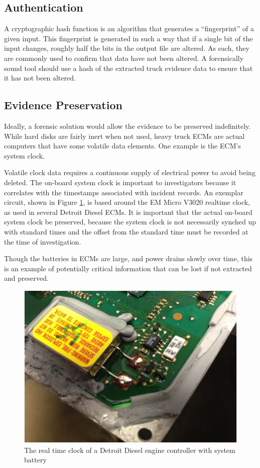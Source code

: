 \subsection{Authentication}

A cryptographic hash function is an algorithm that generates a “fingerprint” of a given input. This fingerprint is generated in such a way that if a single bit of the input changes, 
roughly half the bits in the output file are altered\cite{schneier1996}. As such, they are commonly used to confirm that data have not been altered. A forensically sound tool should use a hash of 
the extracted truck evidence data to ensure that it has not been altered.

\subsection{Evidence Preservation}

Ideally, a forensic solution would allow the evidence to be preserved indefinitely. While hard disks are fairly inert when not used, heavy truck ECMs are actual computers that 
have some volatile data elements. One example is the ECM's system clock.

Volatile clock data requires a continuous supply of electrical power to avoid being deleted. The on-board 
system clock is important to investigators because it correlates with the timestamps associated with incident records. An exemplar circuit, shown in Figure \ref{fig:clockbatt}, is based around 
the EM Micro V3020 realtime clock, as used in several Detroit Diesel ECMs.  It is important that the actual on-board system clock be preserved, because the system clock is not necessarily synched 
up with standard times and the offset from the standard time must be recorded at the time of investigation.

Though the batteries in ECMs are large, and power drains slowly over time, this is an example of potentially critical information that can be lost if not extracted and preserved.

\begin{figure}[h]
  \centering
  \includegraphics{clockbatt}
  \caption{The real time clock of a Detroit Diesel engine controller with system battery}
  \label{fig:clockbatt}

\end{figure}


